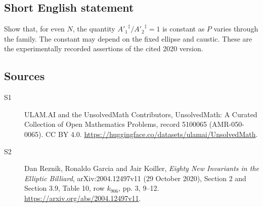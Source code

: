 \documentclass[11pt]{article}
\begin{document}
\subsection{Short English statement}
Show that, for even $N$, the quantity ${A'_1}^\ddagger/{A'_2}^\ddagger=1$ is constant as $P$ varies through the family. The constant may depend on the fixed ellipse and caustic. These are the experimentally recorded assertions of the cited 2020 version.
\subsection{Sources}
\begin{description}
\item[\hypertarget{source:5100065:1}{S1}] ULAM.AI and the UnsolvedMath Contributors, UnsolvedMath: A Curated Collection of Open Mathematics Problems, record 5100065 (AMR-050-0065). CC BY 4.0. \url{https://huggingface.co/datasets/ulamai/UnsolvedMath}.
\item[\hypertarget{source:5100065:2}{S2}] Dan Reznik, Ronaldo Garcia and Jair Koiller, \emph{Eighty New Invariants in the Elliptic Billiard}, arXiv:2004.12497v11 (29 October 2020), Section 2 and Section 3.9, Table 10, row $k_{906}$, pp. 3, 9--12. \url{https://arxiv.org/abs/2004.12497v11}.
\end{description}
\label{end:5100065}
\end{document}
